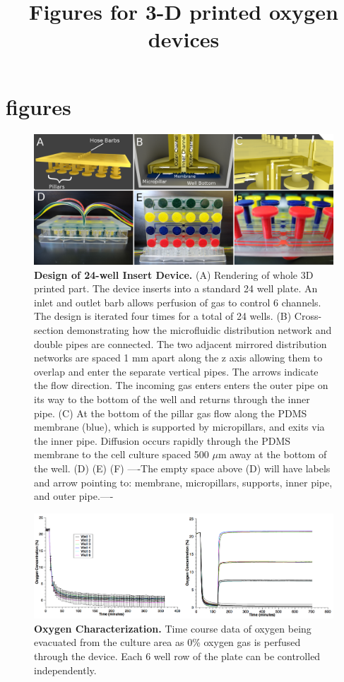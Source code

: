 \documentclass[]{article}
\title{Figures for  3-D printed oxygen devices}
\author{}
\begin{document}

\section{figures}

\begin{figure}[H]
\includegraphics[scale=.75]{fig1.png} 
\caption{
{\bf Design of 24-well Insert Device.}
(A) Rendering of whole 3D printed part.
The device inserts into a standard 24 well plate.
An inlet and outlet barb allows perfusion of gas to control 6 channels.
The design is iterated four times for a total of 24 wells.
(B) Cross-section demonstrating how the microfluidic distribution network and double pipes are connected. 
The two adjacent mirrored distribution networks are spaced 1 mm apart along the z axis allowing them to overlap and enter the separate vertical pipes.
The arrows indicate the flow direction.
The incoming gas enters enters the outer pipe on its way to the bottom of the well and returns through the inner pipe.
(C) At the bottom of the pillar gas flow along the PDMS membrane (blue), which is supported by micropillars, and exits via the inner pipe.
Diffusion occurs rapidly through the PDMS membrane to the cell culture spaced 500 $\mu$m away at the bottom of the well.
(D) 
(E)
(F)
----The empty space above (D) will have labels and arrow pointing to: membrane, micropillars, supports, inner pipe, and outer pipe.----
}
\label{figure1}
\end{figure}

\begin{figure}[H]
\includegraphics[scale=0.25]{fig2.png}
\caption{
{\bf Oxygen Characterization.}  Time course data of oxygen being evacuated from the culture area as 0\% oxygen gas is perfused through the device. Each 6 well row of the plate can be controlled independently.  
}
\label{figure2}
\end{figure}
\end{document}
